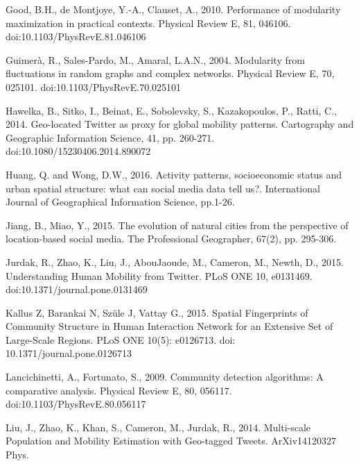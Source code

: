 \documentclass[]{tGIS2e}
\begin{document}
{\begin{thebibliography}{9}
Good, B.H., de Montjoye, Y.-A., Clauset, A., 2010. Performance of modularity maximization in practical contexts. Physical Review E, 81, 046106. doi:10.1103/PhysRevE.81.046106

Guimerà, R., Sales-Pardo, M., Amaral, L.A.N., 2004. Modularity from fluctuations in random graphs and complex networks. Physical Review E, 70, 025101. doi:10.1103/PhysRevE.70.025101

Hawelka, B., Sitko, I., Beinat, E., Sobolevsky, S., Kazakopoulos, P., Ratti, C., 2014. Geo-located Twitter as proxy for global mobility patterns. Cartography and Geographic Information Science, 41, pp. 260-271. doi:10.1080/15230406.2014.890072

Huang, Q. and Wong, D.W., 2016. Activity patterns, socioeconomic status and urban spatial structure: what can social media data tell us?. International Journal of Geographical Information Science, pp.1-26.

Jiang, B., Miao, Y., 2015. The evolution of natural cities from the perspective of location-based social media. The Professional Geographer, 67(2), pp. 295-306.

Jurdak, R., Zhao, K., Liu, J., AbouJaoude, M., Cameron, M., Newth, D., 2015. Understanding Human Mobility from Twitter. PLoS ONE 10, e0131469. doi:10.1371/journal.pone.0131469

Kallus Z, Barankai N, Szüle J, Vattay G., 2015. Spatial Fingerprints of Community Structure in Human Interaction Network for an Extensive Set of Large-Scale Regions. PLoS ONE 10(5): e0126713. doi: 10.1371/journal.pone.0126713 

Lancichinetti, A., Fortunato, S., 2009. Community detection algorithms: A comparative analysis. Physical Review E, 80, 056117. doi:10.1103/PhysRevE.80.056117

Liu, J., Zhao, K., Khan, S., Cameron, M., Jurdak, R., 2014. Multi-scale Population and Mobility Estimation with Geo-tagged Tweets. ArXiv14120327 Phys.


\end{thebibliography}}
\end{document}
